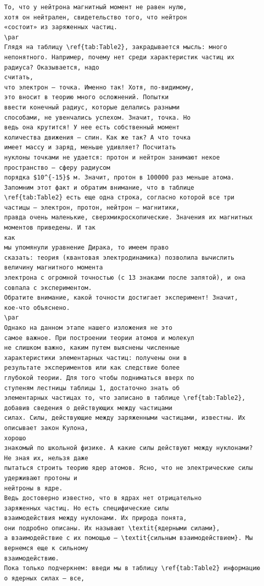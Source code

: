 \documentclass[a4paper,10pt]{article}
\begin{document}
\begin{verbatim}
То, что у нейтрона магнитный момент не равен нулю,
хотя он нейтрален, свидетельство того, что нейтрон
«состоит» из заряженных частиц.
\par
Глядя на таблицу \ref{tab:Table2}, закрадывается мысль: много
непонятного. Например, почему нет среди характеристик частиц их радиуса? Оказывается, надо
считать,
что электрон – точка. Именно так! Хотя, по-видимому,
это вносит в теорию много осложнений. Попытки
ввести конечный радиус, которые делались разными
способами, не увенчались успехом. Значит, точка. Но
ведь она крутится! У нее есть собственный момент
количества движения – спин. Как же так? А что точка
имеет массу и заряд, меньше удивляет? Посчитать
нуклоны точками не удается: протон и нейтрон занимают некое пространство – сферу радиусом
порядка $10^{-15}$ м. Значит, протон в 100000 раз меньше атома.
Запомним этот факт и обратим внимание, что в таблице
\ref{tab:Table2} есть еще одна строка, согласно которой все три
частицы – электрон, протон, нейтрон – магнитики,
правда очень маленькие, сверхмикроскопические. Значения их магнитных моментов приведены. И так
как
мы упомянули уравнение Дирака, то имеем право
сказать: теория (квантовая электродинамика) позволила вычислить величину магнитного момента
электрона с огромной точностью (с 13 знаками после запятой), и она совпала с экспериментом.
Обратите внимание, какой точности достигает эксперимент! Значит,
кое-что объяснено.
\par
Однако на данном этапе нашего изложения не это
самое важное. При построении теории атомов и молекул
не слишком важно, каким путем выяснены численные
характеристики элементарных частиц: получены они в
результате экспериментов или как следствие более
глубокой теории. Для того чтобы подниматься вверх по
ступеням лестницы таблицы 1, достаточно знать об
элементарных частицах то, что записано в таблице \ref{tab:Table2},
добавив сведения о действующих между частицами
силах. Силы, действующие между заряженными частицами, известны. Их описывает закон Кулона,
хорошо
знакомый по школьной физике. А какие силы действуют между нуклонами? Не зная их, нельзя даже
пытаться строить теорию ядер атомов. Ясно, что не электрические силы удерживают протоны и
нейтроны в ядре.
Ведь достоверно известно, что в ядрах нет отрицательно
заряженных частиц. Но есть специфические силы
взаимодействия между нуклонами. Их природа понята,
они подробно описаны. Их называют \textit{ядерными силами},
а взаимодействие с их помощью – \textit{сильным взаимодействием}. Мы вернемся еще к сильному
взаимодействию.
Пока только подчеркнем: введи мы в таблицу \ref{tab:Table2} информацию о ядерных силах – все,

\end{verbatim}
\end{document}
